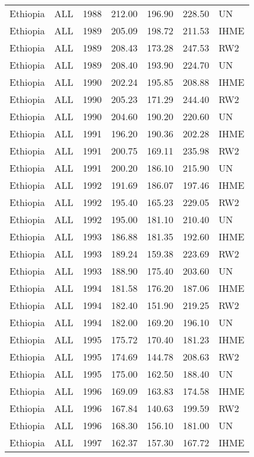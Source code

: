 \begin{longtable}{lllrrrl}
  Ethiopia & ALL & 1988 & 212.00 & 196.90 & 228.50 & UN \\ 
  Ethiopia & ALL & 1989 & 205.09 & 198.72 & 211.53 & IHME \\ 
  Ethiopia & ALL & 1989 & 208.43 & 173.28 & 247.53 & RW2 \\ 
  Ethiopia & ALL & 1989 & 208.40 & 193.90 & 224.70 & UN \\ 
  Ethiopia & ALL & 1990 & 202.24 & 195.85 & 208.88 & IHME \\ 
  Ethiopia & ALL & 1990 & 205.23 & 171.29 & 244.40 & RW2 \\ 
  Ethiopia & ALL & 1990 & 204.60 & 190.20 & 220.60 & UN \\ 
  Ethiopia & ALL & 1991 & 196.20 & 190.36 & 202.28 & IHME \\ 
  Ethiopia & ALL & 1991 & 200.75 & 169.11 & 235.98 & RW2 \\ 
  Ethiopia & ALL & 1991 & 200.20 & 186.10 & 215.90 & UN \\ 
  Ethiopia & ALL & 1992 & 191.69 & 186.07 & 197.46 & IHME \\ 
  Ethiopia & ALL & 1992 & 195.40 & 165.23 & 229.05 & RW2 \\ 
  Ethiopia & ALL & 1992 & 195.00 & 181.10 & 210.40 & UN \\ 
  Ethiopia & ALL & 1993 & 186.88 & 181.35 & 192.60 & IHME \\ 
  Ethiopia & ALL & 1993 & 189.24 & 159.38 & 223.69 & RW2 \\ 
  Ethiopia & ALL & 1993 & 188.90 & 175.40 & 203.60 & UN \\ 
  Ethiopia & ALL & 1994 & 181.58 & 176.20 & 187.06 & IHME \\ 
  Ethiopia & ALL & 1994 & 182.40 & 151.90 & 219.25 & RW2 \\ 
  Ethiopia & ALL & 1994 & 182.00 & 169.20 & 196.10 & UN \\ 
  Ethiopia & ALL & 1995 & 175.72 & 170.40 & 181.23 & IHME \\ 
  Ethiopia & ALL & 1995 & 174.69 & 144.78 & 208.63 & RW2 \\ 
  Ethiopia & ALL & 1995 & 175.00 & 162.50 & 188.40 & UN \\ 
  Ethiopia & ALL & 1996 & 169.09 & 163.83 & 174.58 & IHME \\ 
  Ethiopia & ALL & 1996 & 167.84 & 140.63 & 199.59 & RW2 \\ 
  Ethiopia & ALL & 1996 & 168.30 & 156.10 & 181.00 & UN \\ 
  Ethiopia & ALL & 1997 & 162.37 & 157.30 & 167.72 & IHME \\ 

\end{longtable}
